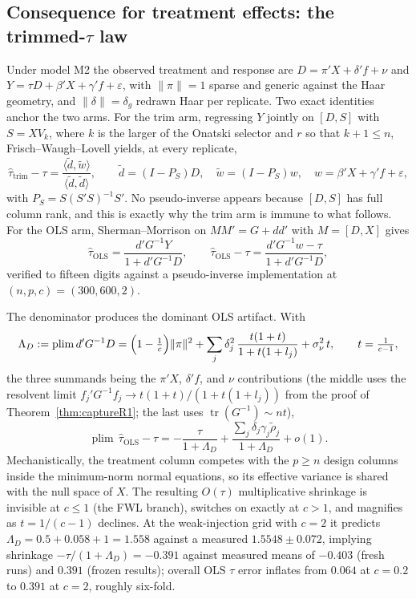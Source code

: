 \subsection{Consequence for treatment effects: the trimmed-$\tau$ law}\label{subsec:trimtau}

Under model M2 the observed treatment and response are $D=\pi'X+\delta'f+\nu$ and $Y=\tau D+\beta'X+\gamma'f+\varepsilon$, with $\|\pi\|=1$ sparse and generic against the Haar geometry, and $\|\delta\|=\delta_g$ redrawn Haar per replicate. Two exact identities anchor the two arms. For the trim arm, regressing $Y$ jointly on $[D,S]$ with $S=XV_k$, where $k$ is the larger of the Onatski selector and $r$ so that $k+1\le n$, Frisch--Waugh--Lovell yields, at every replicate,
\[
\hat\tau_{\mathrm{trim}}-\tau=\frac{\langle\tilde d,\tilde w\rangle}{\langle\tilde d,\tilde d\rangle},
\qquad \tilde d=(I-P_S)D,\quad \tilde w=(I-P_S)w,\quad w=\beta'X+\gamma'f+\varepsilon,
\]
with $P_S=S(S'S)^{-1}S'$. No pseudo-inverse appears because $[D,S]$ has full column rank, and this is exactly why the trim arm is immune to what follows. For the OLS arm, Sherman--Morrison on $MM'=G+dd'$ with $M=[D,X]$ gives
\[
\hat\tau_{\mathrm{OLS}}=\frac{d'G^{-1}Y}{1+d'G^{-1}D},
\qquad
\hat\tau_{\mathrm{OLS}}-\tau=\frac{d'G^{-1}w-\tau}{1+d'G^{-1}D},
\]
verified to fifteen digits against a pseudo-inverse implementation at $(n,p,c)=(300,600,2)$.

The denominator produces the dominant OLS artifact. With
\[
\Lambda_D:=\operatorname{plim} d'G^{-1}D
=\Bigl(1-\tfrac1c\Bigr)\|\pi\|^2
+\sum_j\delta_j^2\,\frac{t(1+t)}{1+t(1+l_j)}
+\sigma_\nu^2\,t,
\qquad t=\tfrac1{c-1},
\]
the three summands being the $\pi'X$, $\delta'f$, and $\nu$ contributions (the middle uses the resolvent limit $f_j'G^{-1}f_j\to t(1+t)/(1+t(1+l_j))$ from the proof of Theorem~\ref{thm:captureR1}; the last uses $\operatorname{tr}(G^{-1})\sim nt$),
\[
\operatorname{plim}\,\hat\tau_{\mathrm{OLS}}-\tau
=-\frac{\tau}{1+\Lambda_D}
+\frac{\sum_j\delta_j\gamma_j\tilde\rho_j}{1+\Lambda_D}+o(1).
\]
Mechanistically, the treatment column competes with the $p\ge n$ design columns inside the minimum-norm normal equations, so its effective variance is shared with the null space of $X$. The resulting $O(\tau)$ multiplicative shrinkage is invisible at $c\le 1$ (the FWL branch), switches on exactly at $c>1$, and magnifies as $t=1/(c-1)$ declines. At the weak-injection grid with $c=2$ it predicts $\Lambda_D=0.5+0.058+1=1.558$ against a measured $1.5548\pm 0.072$, implying shrinkage $-\tau/(1+\Lambda_D)=-0.391$ against measured means of $-0.403$ (fresh runs) and $0.391$ (frozen results); overall OLS $\tau$ error inflates from $0.064$ at $c=0.2$ to $0.391$ at $c=2$, roughly six-fold.

